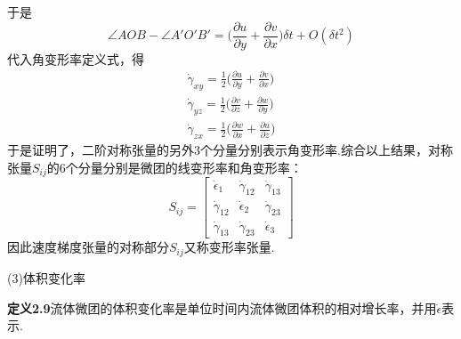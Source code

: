 于是
\[
\angle AOB-\angle A'O'B'=\Big(\frac{\partial u}{\partial y}+\frac{\partial v}{\partial x}\Big)\delta t+O(\delta t^{2})
\]
代入角变形率定义式，得
\begin{gather*}
\dot{\gamma}_{xy}=\frac{1}{2}\Big(\frac{\partial u}{\partial y}+\frac{\partial v}{\partial x}\Big)\tag{2.29a}\\[2pt]
\dot{\gamma}_{yz}=\frac{1}{2}\Big(\frac{\partial v}{\partial z}+\frac{\partial w}{\partial y}\Big)\tag{2.29b}\\[2pt]
\dot{\gamma}_{zx}=\frac{1}{2}\Big(\frac{\partial w}{\partial x}+\frac{\partial u}{\partial z}\Big)\tag{2.29c}
\end{gather*}
于是证明了，二阶对称张量的另外3个分量分别表示角变形率.综合以上结果，对称张量$S_{ij}$的6个分量分别是微团的线变形率和角变形率：
\begin{equation*}
S_{ij}=\begin{bmatrix}
\dot{\epsilon}_1 & \dot{\gamma}_{12} & \dot{\gamma}_{13}\\
\dot{\gamma}_{12} & \dot{\epsilon}_2 & \dot{\gamma}_{23}\\
\dot{\gamma}_{13} & \dot{\gamma}_{23} & \dot{\epsilon}_3
\end{bmatrix}
\tag{2.30}
\end{equation*}
因此速度梯度张量的对称部分$S_{ij}$又称变形率张量.

(3)体积变化率

\noindent\textbf{定义2.9}\quad 流体微团的体积变化率是单位时间内流体微团体积的相对增长率，并用$\dot{\epsilon}$表示.

